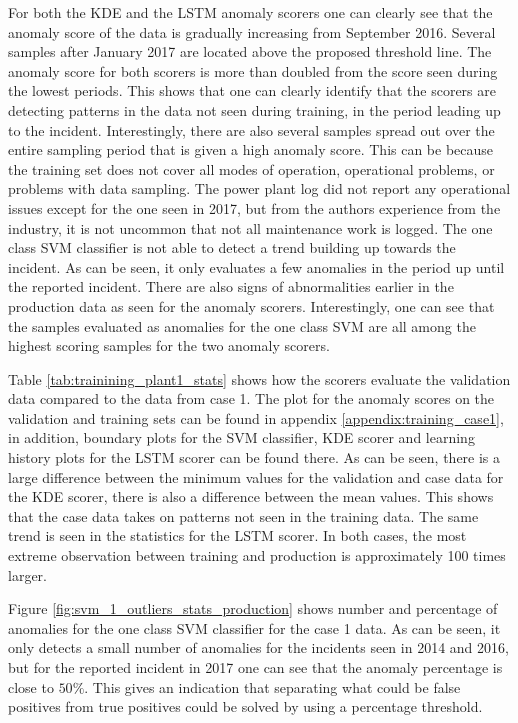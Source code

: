         For both the KDE and the LSTM anomaly scorers one can clearly see that the anomaly score of the data is gradually increasing from September 2016. Several samples after January 2017 are located above the proposed threshold line. The anomaly score for both scorers is more than doubled from the score seen during the lowest periods. This shows that one can clearly identify that the scorers are detecting patterns in the data not seen during training, in the period leading up to the incident. Interestingly, there are also several samples spread out over the entire sampling period that is given a high anomaly score. This can be because the training set does not cover all modes of operation, operational problems, or problems with data sampling. The power plant log did not report any operational issues except for the one seen in 2017, but from the authors experience from the industry, it is not uncommon that not all maintenance work is logged. The one class SVM classifier is not able to detect a trend building up towards the incident. As can be seen, it only evaluates a few anomalies in the period up until the reported incident. There are also signs of abnormalities earlier in the production data as seen for the anomaly scorers. Interestingly, one can see that the samples evaluated as anomalies for the one class SVM are all among the highest scoring samples for the two anomaly scorers. 
        
        Table \ref{tab:trainining_plant1_stats} shows how the scorers evaluate the validation data compared to the data from case 1. The plot for the anomaly scores on the validation and training sets can be found in appendix \ref{appendix:training_case1}, in addition, boundary plots for the SVM classifier, KDE scorer and learning history plots for the LSTM scorer can be found there. As can be seen, there is a large difference between the minimum values for the validation and case data for the KDE scorer, there is also a difference between the mean values. This shows that the case data takes on patterns not seen in the training data. The same trend is seen in the statistics for the LSTM scorer. In both cases, the most extreme observation between training and production is approximately 100 times larger.
        
        Figure \ref{fig:svm_1_outliers_stats_production} shows number and percentage of anomalies for the one class SVM classifier for the case 1 data. As can be seen, it only detects a small number of anomalies for the incidents seen in 2014 and 2016, but for the reported incident in 2017 one can see that the anomaly percentage is close to $50\%$. This gives an indication that separating what could be false positives from true positives could be solved by using a percentage threshold. 
        

